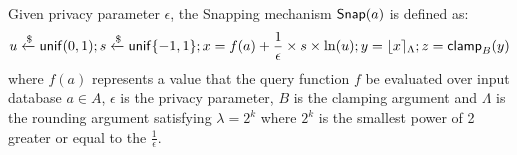 \documentclass[a4paper,11pt]{article}
\begin{document}
\begin{defn}
Given privacy parameter $\epsilon$, the Snapping mechanism $\mathsf{Snap}(a)$ is defined as:
\[
	u \xleftarrow{\$} \mathsf{unif}(0,1); s \xleftarrow{\$} \mathsf{unif}\{-1, 1\};
	x = f(a) + \frac{1}{\epsilon} \times s \times \ln (u);
	y = \lfloor x \rceil_{\Lambda};
	z = \mathsf{clamp}_B (y)
\]
where $f(a)$ represents a value that the query function $f$ be evaluated over input database $a \in A$, $\epsilon$ is the privacy parameter, $B$ is the clamping argument and $\Lambda$ is the rounding argument satisfying $\lambda = 2^k$ where $2^k$ is the smallest power of 2 greater or equal to the $\frac{1}{\epsilon}$.
\end{defn}
%
\begin{thm}
\end{thm}
\end{document}
